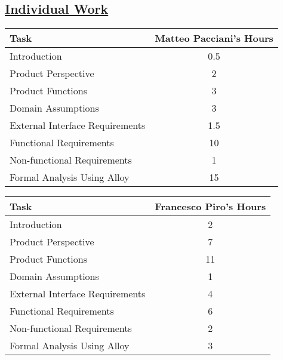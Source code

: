 \subsection[Individual Work]{\hyperlink{toc}{Individual Work}}
\vspace{2mm}
\begin{center}
	\begin{tabular}{| l | c |}
	\hline
	\textbf{Task} & \textbf{Matteo Pacciani's Hours} \\ \hline
	Introduction & 0.5 \\ \hline
	Product Perspective & 2 \\ \hline
	Product Functions & 3 \\ \hline
	Domain Assumptions & 3 \\ \hline
	External Interface Requirements & 1.5 \\ \hline
	Functional Requirements & 10 \\ \hline
	Non-functional Requirements & 1 \\ \hline
	Formal Analysis Using Alloy & 15 \\
	\hline	
	\end{tabular}
	
	\vspace{2mm}
	
	\begin{tabular}{| l | c |}
	\hline
	\textbf{Task} & \textbf{Francesco Piro's Hours} \\ \hline
	Introduction & 2 \\ \hline
	Product Perspective & 7 \\ \hline
	Product Functions & 11 \\ \hline
	Domain Assumptions & 1 \\ \hline
	External Interface Requirements & 4 \\ \hline
	Functional Requirements & 6 \\ \hline
	Non-functional Requirements & 2 \\ \hline
	Formal Analysis Using Alloy & 3 \\
	\hline	
	\end{tabular}
\end{center}
